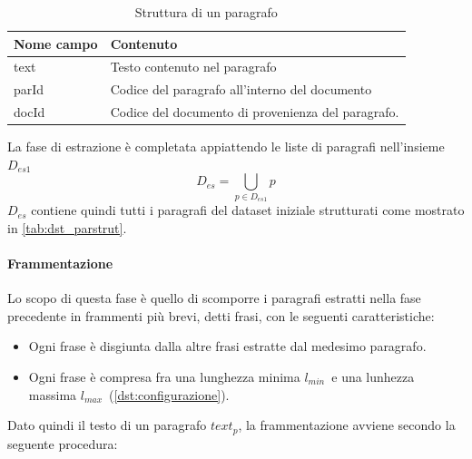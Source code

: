 \begin{table}[H]
\centering
\begin{tabular}{ll}
\textbf{Nome campo} & \textbf{Contenuto} \\ \hline
text  & Testo contenuto nel paragrafo\\
parId & Codice del paragrafo all'interno del documento \\
docId & Codice del documento di provenienza del paragrafo.
\end{tabular}
\caption{Struttura di un paragrafo}
\label{tab:dst_parstrut}
\end{table}

La fase di estrazione è completata appiattendo le liste di paragrafi nell'insieme $D_{es1}$ 
\begin{equation}
D_{es} = \bigcup\limits_{p \in D_{es1}} p
\end{equation}
$D_{es}$ contiene quindi tutti i paragrafi del dataset iniziale strutturati come mostrato in \autoref{tab:dst_parstrut}.



\paragraph{Frammentazione}
Lo scopo di questa fase è quello di scomporre i paragrafi estratti nella fase precedente in frammenti più brevi, detti frasi, con le seguenti caratteristiche:
\newcommand{\lmin}{$l_{min}$}
\newcommand{\lmax}{$l_{max}$}
\begin{itemize}
\item Ogni frase è disgiunta dalla altre frasi estratte dal medesimo paragrafo.
\item Ogni frase è compresa fra una lunghezza minima \lmin\ e una lunhezza massima \lmax\ (\autoref{dst:configurazione}).
\end{itemize}

Dato quindi il testo di un paragrafo $text_p$, la frammentazione avviene secondo la seguente procedura:

